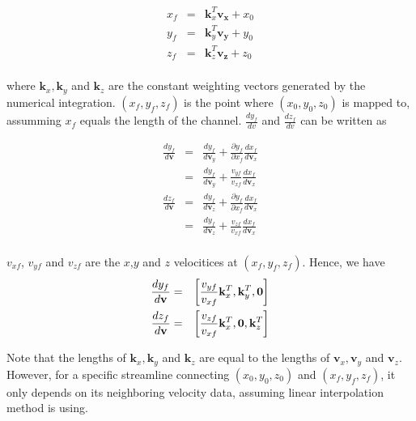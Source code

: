 \documentclass{article}
\begin{document}
\begin{eqnarray*}
 x_{f} & = & \mathbf{k}_{x}^T \mathbf{v_{x}}+x_{0}\\
 y_{f} & = & \mathbf{k}_{y}^T \mathbf{v_{y}}+y_{0}\\
 z_{f} & = & \mathbf{k}_{z}^T \mathbf{v_{z}}+z_{0}\\
\end{eqnarray*}

where $\mathbf{k}_{x},\mathbf{k}_{y}$ and $\mathbf{k}_{z}$ are the constant weighting vectors generated by the numerical integration. $(x_{f},y_{f},z_{f})$ is the point where $(x_{0},y_{0},z_{0})$ is mapped to, assumming $x_{f}$ equals the length of the channel. $\frac{dy_{f}}{dv}$ and $\frac{dz_{f}}{dv}$ can be written as
 
\begin{eqnarray*}
 \frac{dy_{f}}{d\mathbf{v}} & = & \frac{dy_{f}}{d\mathbf{v}_{y}}+
                                  \frac{\partial{y_{f}}}{\partial{x_{f}}} \frac{dx_{f}}{d\mathbf{v}_{x}}\\
                            & = & \frac{dy_{f}}{d\mathbf{v}_{y}}+\frac{v_{yf}}{v_{xf}} \frac{dx_{f}}{d\mathbf{v}_{x}} \\
 \frac{dz_{f}}{d\mathbf{v}} & = & \frac{dy_{f}}{d\mathbf{v}_{z}}+
                                  \frac{\partial{y_{f}}}{\partial{x_{f}}} \frac{dx_{f}}{d\mathbf{v}_{x}} \\
                            & = & \frac{dy_{f}}{d\mathbf{v}_{z}}+\frac{v_{zf}}{v_{xf}} \frac{dx_{f}}{d\mathbf{v}_{x}} \\
\end{eqnarray*}

$v_{xf}$, $v_{yf}$ and $v_{zf}$ are the $x$,$y$ and $z$ velocitices at $(x_{f},y_{f},z_{f})$. Hence, we have
\begin{eqnarray*}
 \frac{dy_{f}}{d\mathbf{v}} & = & \left[\frac{v_{yf}}{v_{xf}}\mathbf{k}_{x}^T, 
                                        \mathbf{k}_{y}^T ,\mbox{\boldmath$0$}    \right]\\
 \frac{dz_{f}}{d\mathbf{v}} & = & \left[\frac{v_{zf}}{v_{xf}}\mathbf{k}_{x}^T, 
                                        \mbox{\boldmath$0$}, \mathbf{k}_{z}^T   \right]\\
\end{eqnarray*}
 
Note that the lengths of $\mathbf{k}_{x},\mathbf{k}_{y}$ and $\mathbf{k}_{z}$ are equal to the lengths of $\mathbf{v}_x,\mathbf{v}_y$ and $\mathbf{v}_z$. However, for a specific streamline connecting $(x_0,y_0,z_0)$ and $(x_f,y_f,z_f)$, it only depends on its neighboring velocity data, assuming linear interpolation method is using.  
\end{document}
